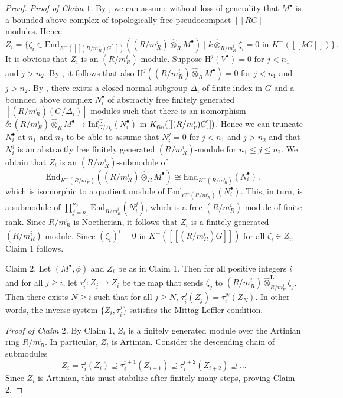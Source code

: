 \documentclass{amsart}
\theoremstyle{plain}
\theoremstyle{definition}
\theoremstyle{remark}
\begin{document}
\begin{proof}
\noindent
\textit{Proof of Claim $1$.} 
By \cite[Lemma 4.2]{bcderived}, we can assume without loss of generality that $M^\bullet$ is a bounded
above complex of topologically free pseudocompact $[[RG]]$-modules. Hence
\begin{equation}
\label{eq:nicerzi}
Z_i=\{\zeta_i\in\mathrm{End}_{K^-([[(R/m_R^i)G]])}((R/m_R^i)\hat{\otimes}_R {M}^\bullet)\;
|\;k\hat{\otimes}_{R/m_R^{i}}\zeta_i=0\mbox{ in } K^-([[kG]])\}\,.
\end{equation}
It is obvious that $Z_i$ is an $(R/m_R^i)$-module. Suppose ${\mathrm{H}}^j(V^\bullet)=0$ for $j<n_1$ and
$j>n_2$. By \cite[Thm. 2.10]{obstructions}, it follows that also 
${\mathrm{H}}^j((R/m_R^i)\hat{\otimes}_R {M}^\bullet)=0$ for $j<n_1$ and $j>n_2$.
By \cite[Cor. 3.6(i)]{bcderived},  there exists a closed normal subgroup $\Delta_i$ of finite index in $G$ 
and a bounded above complex $N_i^\bullet$ of abstractly free finitely generated 
$[(R/m_R^i)(G/\Delta_i)]$-modules such that there is an isomorphism
$\delta: (R/m_R^i)\hat{\otimes}_R {M}^\bullet\to \mathrm{Inf}_{G/\Delta_i}^G(N_i^\bullet)$ in 
$K^{-}_{\mathrm{f\/in}}([[(R/m_r^i)G]])$. Hence we can truncate $N_i^\bullet$ at $n_1$ and $n_2$ to be able to 
assume that $N_i^j=0$ for $j<n_1$ and $j>n_2$ and that $N_i^j$ is an abstractly free finitely generated 
$(R/m_R^i)$-module for $n_1\le j\le n_2$. We obtain that $Z_i$ is an $(R/m_R^i)$-submodule of
$$\mathrm{End}_{K^-(R/m_R^i)}((R/m_R^i)\hat{\otimes}_R {M}^\bullet)\cong
\mathrm{End}_{K^-(R/m_R^i)}(N_i^\bullet)\,,$$
which is isomorphic to a quotient module of $\mathrm{End}_{C^-(R/m_R^i)}(N_i^\bullet)$. This, in
turn, is a submodule of $\prod_{j=n_1}^{n_2}\mathrm{End}_{R/m_R^i}(N_i^j)$, which is a free
$(R/m_R^i)$-module of finite rank. Since $R/m_R^i$ is Noetherian, it follows that
$Z_i$ is a finitely generated $(R/m_R^i)$-module. 
Since $(\zeta_i)^i=0$ in $K^-([[(R/m_R^i)G]])$ for all $\zeta_i\in Z_i$, Claim 1 follows.

\medskip

\noindent
{\sc Claim 2.} Let $(M^\bullet,\phi)$ and $Z_i$ be as in Claim 1. 
Then for all positive integers $i$ and for all $j\ge i$, let $\tau^j_i: Z_j\to Z_i$ be the map 
that sends $\zeta_j$ to $(R/m_R^i)\hat{\otimes}^{\mathbf{L}}_{R/m_R^j}\zeta_j$. Then
there exists $N\ge i$ such that for all $j\ge N$, $\tau^j_i(Z_j)=\tau^N_i(Z_N)$. In other words,
the inverse system $\{Z_i, \tau^j_i\}$ satisfies the Mittag-Leffler condition.

\medskip

\noindent
\textit{Proof of Claim $2$.}
By Claim 1, $Z_i$ is a finitely generated module over the Artinian ring $R/m_R^i$. In particular,
$Z_i$ is Artinian. Consider the descending chain of submodules
$$Z_i= \tau^i_i(Z_i)\supseteq \tau^{i+1}_i(Z_{i+1})\supseteq \tau^{i+2}_i(Z_{i+2})\supseteq \ldots$$
Since $Z_i$ is Artinian, this must stabilize after finitely many steps, proving Claim 2.


\end{proof}
\end{document}
